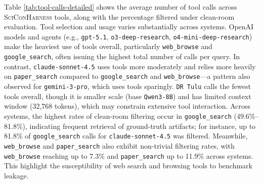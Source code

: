 \documentclass{article}
\begin{document}
Table \ref{tab:tool-calls-detailed} shows the average number of tool calls across \textsc{SciConHarness} tools, along with the percentage filtered under clean-room evaluation. Tool selection and usage varies substantially across systems. OpenAI models and agents (e.g., \texttt{gpt-5.1}, \texttt{o3-deep-research}, \texttt{o4-mini-deep-research}) make the heaviest use of tools overall, particularly \texttt{web\_browse} and \texttt{google\_search}, often issuing the highest total number of calls per query. In contrast, \texttt{claude-sonnet-4.5} uses tools more moderately and relies more heavily on \texttt{paper\_search} compared to \texttt{google\_search} and \texttt{web\_browse}---a pattern also observed for \texttt{gemini-3-pro}, which uses tools sparingly. \texttt{DR Tulu} calls the fewest tools overall, though it is smaller scale (base \texttt{Qwen3-8B}) and has limited context window (32{,}768 tokens), which may constrain extensive tool interaction. Across systems, the highest rates of clean-room filtering occur in \texttt{google\_search} (49.6\%–81.8\%), indicating frequent retrieval of ground-truth artifacts; for instance, up to 81.8\% of \texttt{google\_search} calls for \texttt{claude-sonnet-4.5} was filtered. Meanwhile, \texttt{web\_browse} and \texttt{paper\_search} also exhibit non-trivial filtering rates, with \texttt{web\_browse} reaching up to 7.3\% and \texttt{paper\_search} up to 11.9\% across systems. This highlight the susceptibility of web search and browsing tools to benchmark leakage. 
\end{document}
